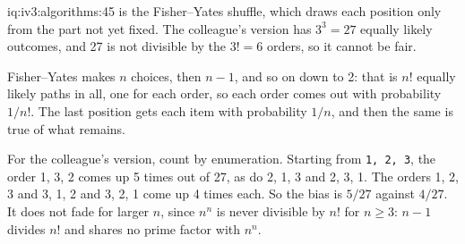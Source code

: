 \begin{solution}{iq:iv3:algorithms:45}
 is the Fisher--Yates shuffle, which draws each position only from the part not yet fixed. The colleague's version has $3^3 = 27$ equally likely outcomes, and 27 is not divisible by the $3! = 6$ orders, so it cannot be fair.
\enlargethispage{-3\baselineskip}%
\label{lst:iv3:al:shuffle}

Fisher--Yates makes $n$ choices, then $n - 1$, and so on down to 2: that is $n!$ equally likely paths in all, one for each order, so each order comes out with probability $1/n!$. The last position gets each item with probability $1/n$, and then the same is true of what remains.

For the colleague's version, count by enumeration. Starting from \texttt{1, 2, 3}, the order 1, 3, 2 comes up 5 times out of 27, as do 2, 1, 3 and 2, 3, 1. The orders 1, 2, 3 and 3, 1, 2 and 3, 2, 1 come up 4 times each. So the bias is $5/27$ against $4/27$. It does not fade for larger $n$, since $n^n$ is never divisible by $n!$ for $n \ge 3$: $n - 1$ divides $n!$ and shares no prime factor with $n^n$.

\end{solution}


